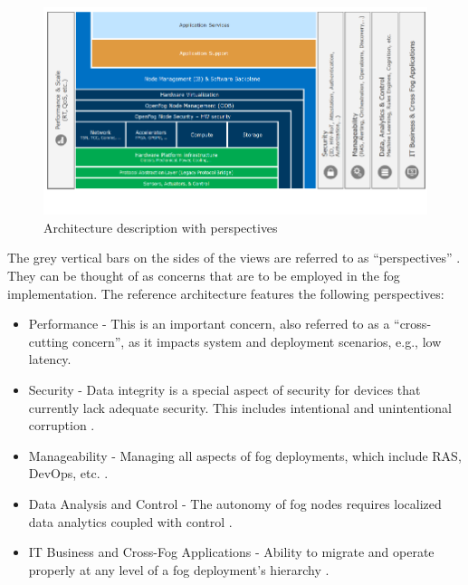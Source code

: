 \documentclass{article}
\begin{document}
\begin{figure}[H]
	\centering
	\includegraphics[scale=0.5]{figa.png}
	\caption{Architecture description with perspectives \cite{openfogconsortium2017}}
	\label{fig:openfog_ra}
\end{figure} 

The grey vertical bars on the sides of the views are referred to as ``perspectives'' \cite{openfogconsortium2017}. They can be thought of as concerns that are to be employed in the fog implementation. The reference architecture features the following perspectives:

\begin{itemize}
\item Performance - This is an important concern, also referred to as a ``cross-cutting concern'', as it impacts system and deployment scenarios, e.g., low latency.

\item Security - Data integrity is a special aspect of security for devices that currently lack adequate security. This includes intentional and unintentional corruption \cite{openfogconsortium2017}.

\item Manageability - Managing all aspects of fog deployments, which include RAS, DevOps, etc. \cite{openfogconsortium2017}. 

\item Data Analysis and Control -  The autonomy of fog nodes requires localized data analytics coupled with control \cite{openfogconsortium2017}.

\item IT Business and Cross-Fog Applications - Ability to migrate and operate properly at any level of a fog deployment’s hierarchy \cite{openfogconsortium2017}.  
\end{itemize}
\end{document}
